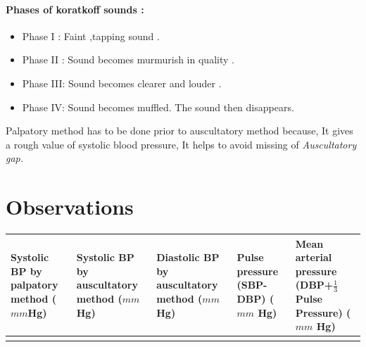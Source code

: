 \documentclass[a4paper,12pt,openany,twoside]{book}
\begin{document}
\paragraph{Phases of koratkoff sounds :}
\begin{itemize}
\item[]Phase I : Faint ,tapping sound .
\item[]Phase II : Sound becomes murmurish in quality .
\item[]Phase III: Sound becomes clearer and louder .
\item[]Phase IV: Sound becomes muffled. The sound then disappears.
\end{itemize}
\par
Palpatory method has to be done prior to auscultatory method because,
It gives a rough value of systolic blood pressure, It helps to avoid missing of \emph{Auscultatory gap.}
\section*{Observations}
\begin{table}[H]

		\setlength\extrarowheight{10pt}
	\small{%
	\begin{tabular}{|p{1in}|p{1in}|p{1in}|p{1in}|p{1in}|}
		\hline
		Systolic BP by palpatory method ($mm$Hg) & Systolic BP by auscultatory method ($mm$Hg) & Diastolic BP by auscultatory method ($mm$ Hg) & Pulse pressure (SBP-DBP) ($mm$ Hg) & Mean arterial pressure (DBP+${\frac{1}{3}}$ Pulse Pressure) ($mm$ Hg) \\ \hline
			                                         &                                             &                                               &                                                                              &                                                                                                               \\ \hline
	\end{tabular}
	}
\end{table}
\end{document}
